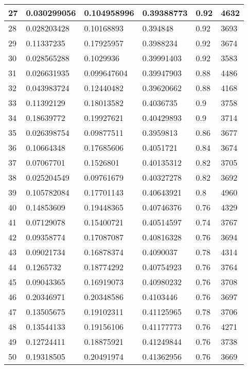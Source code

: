 \begin{longtable}{|l|l|l|l|l|l|}
27 & 0.030299056 & 0.104958996 & 0.39388773 & 0.92 & 4632 \\ \hline 
28 & 0.028203428 & 0.10168893 & 0.394848 & 0.92 & 3693 \\ \hline 
29 & 0.11337235 & 0.17925957 & 0.3988234 & 0.92 & 3674 \\ \hline 
30 & 0.028565288 & 0.1029936 & 0.39991403 & 0.92 & 3583 \\ \hline 
31 & 0.026631935 & 0.099647604 & 0.39947903 & 0.88 & 4486 \\ \hline 
32 & 0.043983724 & 0.12440482 & 0.39620662 & 0.88 & 4168 \\ \hline 
33 & 0.11392129 & 0.18013582 & 0.4036735 & 0.9 & 3758 \\ \hline 
34 & 0.18639772 & 0.19927621 & 0.40429893 & 0.9 & 3714 \\ \hline 
35 & 0.026398754 & 0.09877511 & 0.3959813 & 0.86 & 3677 \\ \hline 
36 & 0.10664348 & 0.17685606 & 0.4051721 & 0.84 & 3674 \\ \hline 
37 & 0.07067701 & 0.1526801 & 0.40135312 & 0.82 & 3705 \\ \hline 
38 & 0.025204549 & 0.09761679 & 0.40327278 & 0.82 & 3692 \\ \hline 
39 & 0.105782084 & 0.17701143 & 0.40643921 & 0.8 & 4960 \\ \hline 
40 & 0.14853609 & 0.19448365 & 0.40746376 & 0.76 & 4329 \\ \hline 
41 & 0.07129078 & 0.15400721 & 0.40514597 & 0.74 & 3767 \\ \hline 
42 & 0.09358774 & 0.17087087 & 0.40816328 & 0.76 & 3694 \\ \hline 
43 & 0.09021734 & 0.16878374 & 0.4090037 & 0.78 & 4314 \\ \hline 
44 & 0.1265732 & 0.18774292 & 0.40754923 & 0.76 & 3764 \\ \hline 
45 & 0.09043365 & 0.16919073 & 0.40980232 & 0.76 & 3708 \\ \hline 
46 & 0.20346971 & 0.20348586 & 0.4103446 & 0.76 & 3697 \\ \hline 
47 & 0.13505675 & 0.19102311 & 0.41125965 & 0.78 & 3706 \\ \hline 
48 & 0.13544133 & 0.19156106 & 0.41177773 & 0.76 & 4271 \\ \hline 
49 & 0.12724411 & 0.18875921 & 0.41249844 & 0.76 & 3738 \\ \hline 
50 & 0.19318505 & 0.20491974 & 0.41362956 & 0.76 & 3669 \\ \hline 
\end{longtable}